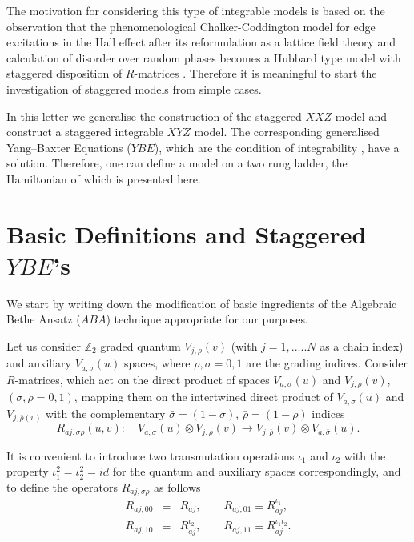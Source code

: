 \documentclass[a4paper,11pt]{article}
\def\ZZ{{\mathbb Z}}
\begin{document}
The motivation for considering this type of integrable models
is based on the observation that the phenomenological
Chalker-Coddington model \cite{CC} for edge excitations in the Hall
effect after its reformulation as a lattice field theory \cite{AS1}
and calculation of disorder over random phases becomes a Hubbard type
model with staggered disposition of $R$-matrices \cite{AS2}. Therefore
it is meaningful  to start the investigation of staggered models
from simple cases.

In this letter we generalise the construction of the staggered $XXZ$ 
model and construct a staggered integrable $XYZ$ model. 
The corresponding generalised Yang--Baxter Equations ($YBE$),
which are the condition of integrability \cite{B,FT}, have a
solution. Therefore, one can define a model on a two rung ladder, the
Hamiltonian of which is presented here.
\section{Basic Definitions and Staggered $YBE$'s}
\setcounter{equation}{0}

\indent

We start by writing down the modification of basic
ingredients
of the Algebraic Bethe Ansatz ($ABA$) technique \cite{B, FT}
appropriate for our purposes.
 
Let us consider $\ZZ_2$ graded quantum $V_{j,\rho}(v)$ 
(with $j=1,.....N$ as a chain index) and 
auxiliary $V_{a,\sigma}(u)$ spaces, where $\rho, \sigma =0,1$ are
the grading indices. Consider
$R$-matrices, which act on the direct product
of  spaces $V_{a,\sigma}(u)$ and $ V_{j,\rho}(v)$, $(\sigma,\rho =0,1)$,
mapping them on the intertwined direct product of 
$V_{a,\bar{\sigma}}(u)$ and $ V_{j,\bar{\rho}(v)}$ with the complementary
$\bar{\sigma}=(1-\sigma)$, $\bar{\rho}=(1-\rho)$ indices
\begin{equation}
\label{R1}
R_{aj,\sigma \rho}\left( u,v\right):\quad V_{a,\sigma}(u)\otimes 
V_{j,\rho}(v)\rightarrow V_{j,\bar{\rho}}(v)\otimes V_{a,\bar{\sigma}}(u).  
\end{equation}


It is convenient to introduce 
two transmutation operations $\iota_1$
and $\iota_2$ with the property $\iota_1^2=\iota_2^2=id$ 
for the quantum and auxiliary spaces
correspondingly, and to define the operators $R_{aj,\sigma\rho}$ as 
follows
\begin{eqnarray}
\label{R2}
R_{aj,00}&\equiv& R_{aj},\qquad R_{aj,01}\equiv R_{aj}^{\iota_1},\nonumber\\
R_{aj,10}&\equiv& R_{aj}^{\iota_2},\qquad R_{aj,11}\equiv R_{aj}^{\iota_1 
\iota_2}.
\end{eqnarray}
\end{document}
